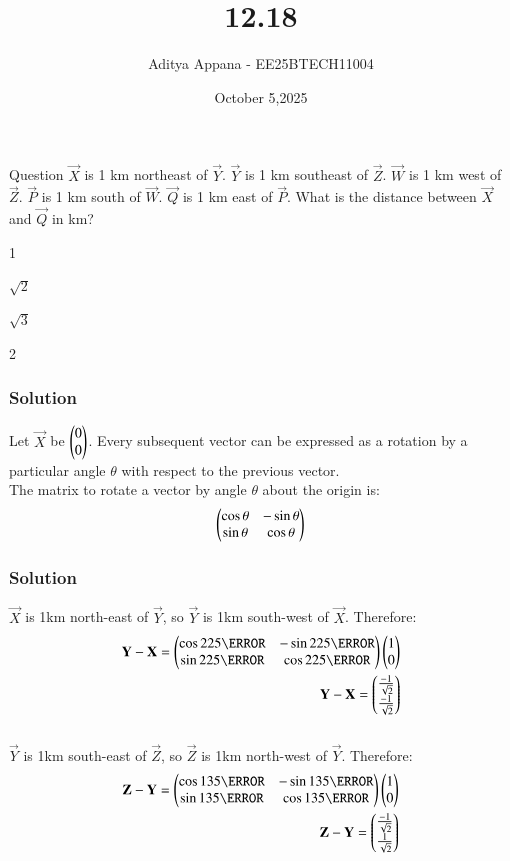 \documentclass{beamer}
\title %
{12.18}
\date{October 5,2025}
\author %
{Aditya Appana - EE25BTECH11004}
\begin{document}
\frame{\titlepage}
\begin{frame}{Question}
$\vec{X}$ is 1 km northeast of $\vec{Y}$. $\vec{Y}$ is 1 km southeast of $\vec{Z}$. $\vec{W}$ is 1 km west of $\vec{Z}$. $\vec{P}$ is 1
km south of $\vec{W}$. $\vec{Q}$ is 1 km east of $\vec{P}$. What is the distance between $\vec{X}$ and $\vec{Q}$ in km?
\begin{enumerate}
\begin{multicols}{4}
    \item 1
    \item $\sqrt{2}$
    \item $\sqrt{3}$
    \item 2
\end{multicols}
\end{enumerate}
\end{frame}



\begin{frame}[fragile]
    \frametitle{Solution}
Let $\vec{X}$ be $\begin{pmatrix}0\\0\end{pmatrix}$. Every subsequent vector can be expressed as a rotation by a particular angle $\theta$ with respect to the previous vector.\\
The matrix to rotate a vector by angle $\theta$ about the origin is:
\begin{align}
\begin{pmatrix}\cos\theta & -\sin\theta \\ \sin\theta & \cos\theta\end{pmatrix}
\end{align}
\end{frame}


\begin{frame}[fragile]
    \frametitle{Solution}
$\vec{X}$ is 1km north-east of $\vec{Y}$, so $\vec{Y}$ is 1km south-west of $\vec{X}$. Therefore:\begin{align}
\vec{Y}-\vec{X} = \myvec{\cos225\degree & -\sin225\degree \\ \sin225\degree & \cos225\degree}\myvec{1\\0}\\
\vec{Y}-\vec{X} = \myvec{\frac{-1}{\sqrt{2}}\\\frac{-1}{\sqrt{2}}}
\end{align}\\
$\vec{Y}$ is 1km south-east of $\vec{Z}$, so $\vec{Z}$ is 1km north-west of $\vec{Y}$. Therefore:\begin{align}
\vec{Z}-\vec{Y} = \myvec{\cos135\degree & -\sin135\degree \\ \sin135\degree & \cos135\degree}\myvec{1\\0}\\
\vec{Z}-\vec{Y} = \myvec{\frac{-1}{\sqrt{2}}\\\frac{1}{\sqrt{2}}}
\end{align}\\
\end{frame}
\end{document}
